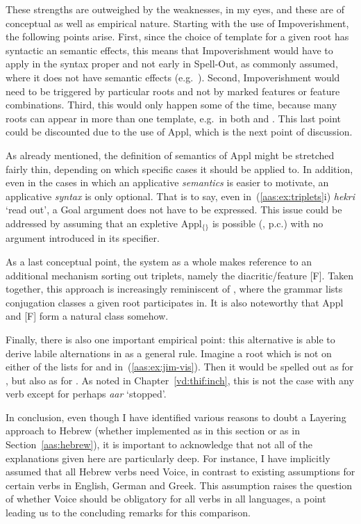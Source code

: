 These strengths are outweighed by the weaknesses, in my eyes, and these are of conceptual as well as empirical nature. Starting with the use of Impoverishment, the following points arise. First, since the choice of template for a given root has syntactic an semantic effects, this means that Impoverishment would have to apply in the syntax proper and not early in Spell-Out, as commonly assumed, where it does not have semantic effects (e.g.~\citealt{harbour03}). Second, Impoverishment would need to be triggered by particular roots and not by marked features or feature combinations. Third, this would only happen some of the time, because many roots can appear in more than one template, e.g.~in both {\thif} and {\tkal}. This last point could be discounted due to the use of Appl, which is the next point of discussion.

As already mentioned, the definition of semantics of Appl might be stretched fairly thin, depending on which specific cases it should be applied to. In addition, even in the cases in which an applicative \emph{semantics} is easier to motivate, an applicative \emph{syntax} is only optional. That is to say, even in~(\ref{aas:ex:triplets}i) \emph{hekri} `read out', a Goal argument does not have to be expressed. This issue could be addressed by assuming that an expletive Appl$_{\text{\{\}}}$ is possible (\citealt{wood15springer}, p.c.) with no argument introduced in its specifier.

As a last conceptual point, the system as a whole makes reference to an additional mechanism sorting out triplets, namely the diacritic/feature [F]. Taken together, this approach is increasingly reminiscent of \cite{arad05}, where the grammar lists conjugation classes a given root participates in. It is also noteworthy that Appl and [F] form a natural class somehow. 

Finally, there is also one important empirical point: this alternative is able to derive labile alternations in {\tkal} as a general rule. Imagine a root  which is not on either of the lists for {\vds} and {\vzs} in~(\ref{aas:ex:jim-vis}). Then it would be spelled out as {\tkal} for {\vds}, but also as {\tkal} for {\vzs}. As noted in Chapter~\ref{vd:thif:inch}, this is not the case with any verb except for perhaps \emph{a{\ts}ar} `stopped'.

In conclusion, even though I have identified various reasons to doubt a Layering approach to Hebrew (whether implemented as in this section or as in Section~\ref{aas:hebrew}), it is important to acknowledge that not all of the explanations given here are particularly deep. For instance, I have implicitly assumed that all Hebrew verbs need Voice, in contrast to existing assumptions for certain verbs in English, German and Greek. This assumption raises the question of whether Voice should be obligatory for all verbs in all languages, a point leading us to the concluding remarks for this comparison.


